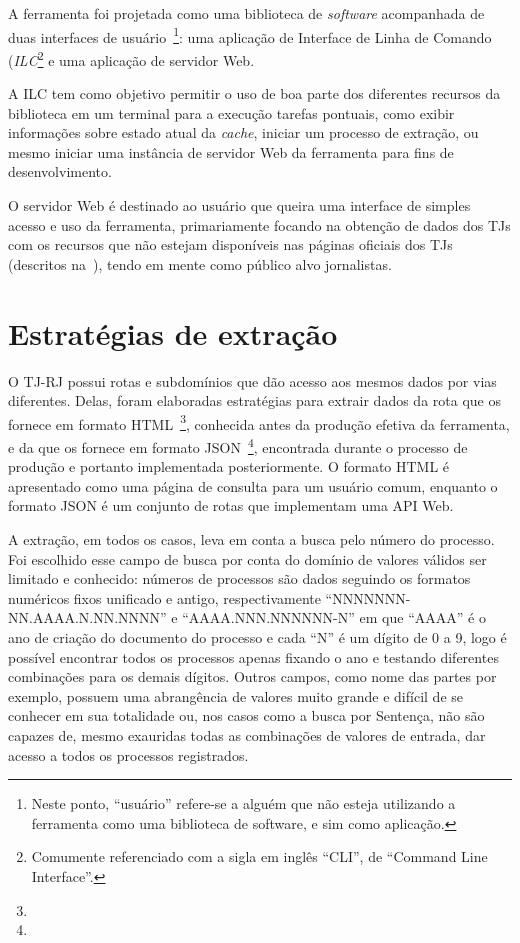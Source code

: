 A ferramenta foi projetada como uma biblioteca de \textit{software} acompanhada
de duas interfaces de usuário~\footnote{Neste ponto, ``usuário'' refere-se a
alguém que não esteja utilizando a ferramenta como uma biblioteca de software,
e sim como aplicação.}: uma aplicação de Interface de Linha de Comando
(\textit{ILC}\footnote{Comumente referenciado com a sigla em inglês ``CLI'', de
``Command Line Interface''.} e uma aplicação de servidor Web.

A ILC tem como objetivo permitir o uso de boa parte dos diferentes recursos da
biblioteca em um terminal para a execução tarefas pontuais, como exibir
informações sobre estado atual da \textit{cache}, iniciar um processo de
extração, ou mesmo iniciar uma instância de servidor Web da ferramenta para
fins de desenvolvimento.

O servidor Web é destinado ao usuário que queira uma interface de simples
acesso e uso da ferramenta, primariamente focando na obtenção de dados dos TJs
com os recursos que não estejam disponíveis nas páginas oficiais dos TJs
(descritos na~), tendo em mente como público alvo
jornalistas.

\section{Estratégias de extração}

O TJ-RJ possui rotas e subdomínios que dão acesso aos mesmos dados por vias
diferentes. Delas, foram elaboradas estratégias para extrair dados da rota que
os fornece em formato HTML~\footnote{}, conhecida antes
da produção efetiva da ferramenta, e da que os fornece em formato
JSON~\footnote{}, encontrada durante o processo de
produção e portanto implementada posteriormente. O formato HTML é apresentado
como uma página de consulta para um usuário comum, enquanto o formato JSON é
um conjunto de rotas que implementam uma API Web.

A extração, em todos os casos, leva em conta a busca pelo número do processo.
Foi escolhido esse campo de busca por conta do domínio de valores válidos ser
limitado e conhecido: números de processos são dados seguindo os formatos
numéricos fixos unificado e antigo, respectivamente
``NNNNNNN-NN.AAAA.N.NN.NNNN'' e ``AAAA.NNN.NNNNNN-N'' em que ``AAAA'' é o ano
de criação do documento do processo e cada ``N'' é um dígito de 0 a 9, logo é
possível encontrar todos os processos apenas fixando o ano e testando
diferentes combinações para os demais dígitos. Outros campos, como nome das
partes por exemplo, possuem uma abrangência de valores muito grande e difícil
de se conhecer em sua totalidade ou, nos casos como a busca por Sentença, não
são capazes de, mesmo exauridas todas as combinações de valores de entrada, dar
acesso a todos os processos registrados.


